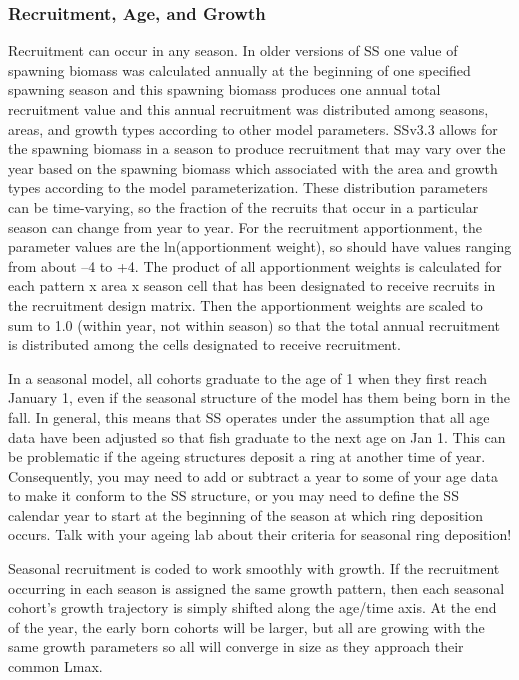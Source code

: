 \subsubsection{Recruitment, Age, and Growth}
Recruitment can occur in any season.  In older versions of SS one value of spawning biomass was calculated annually at the beginning of one specified spawning season and this spawning biomass produces one annual total recruitment value and this annual recruitment was distributed among seasons, areas, and growth types according to other model parameters.  SSv3.3 allows for the spawning biomass in a season to produce recruitment that may vary over the year based on the spawning biomass which associated with the area and growth types according to the model parameterization. These distribution parameters can be time-varying, so the fraction of the recruits that occur in a particular season can change from year to year. For the recruitment apportionment, the parameter values are the ln(apportionment weight), so should have values ranging from about –4 to +4.  The product of all apportionment weights is calculated for each pattern x area x season cell that has been designated to receive recruits in the recruitment design matrix.  Then the apportionment weights are scaled to sum to 1.0 (within year, not within season) so that the total annual recruitment is distributed among the cells designated to receive recruitment.

In a seasonal model, all cohorts graduate to the age of 1 when they first reach January 1, even if the seasonal structure of the model has them being born in the fall.  In general, this means that SS operates under the assumption that all age data have been adjusted so that fish graduate to the next age on Jan 1.  This can be problematic if the ageing structures deposit a ring at another time of year.  Consequently, you may need to add or subtract a year to some of your age data to make it conform to the SS structure, or you may need to define the SS calendar year to start at the beginning of the season at which ring deposition occurs.  Talk with your ageing lab about their criteria for seasonal ring deposition!

Seasonal recruitment is coded to work smoothly with growth.  If the recruitment occurring in each season is assigned the same growth pattern, then each seasonal cohort’s growth trajectory is simply shifted along the age/time axis.  At the end of the year, the early born cohorts will be larger, but all are growing with the same growth parameters so all will converge in size as they approach their common Lmax.

